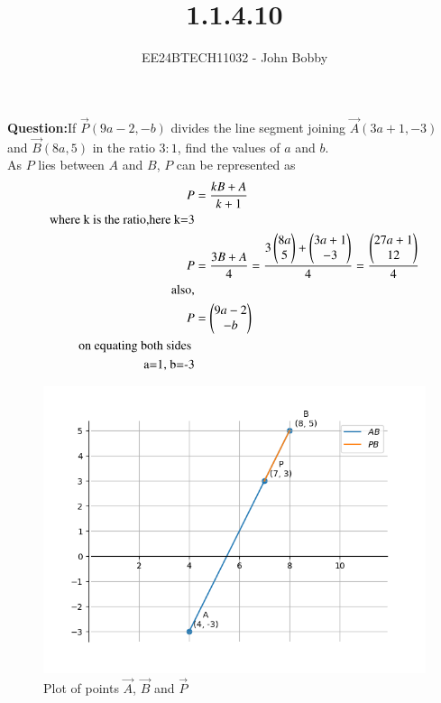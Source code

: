 \documentclass[journal]{IEEEtran}
\begin{document}

\vspace{3cm}
\title{1.1.4.10}
\author{EE24BTECH11032 - John Bobby}
{\let\newpage\relax\maketitle}

\renewcommand{\thefigure}{\theenumi}
\renewcommand{\thetable}{\theenumi}
\setlength{\intextsep}{10pt} %


\renewcommand{\thetable}{\theenumi}

\textbf{Question:}If $\vec{P}(9a-2,-b)$ divides the line segment joining $\vec{A}(3a+1,-3)$ and $\vec{B}(8a,5)$  
		in the ratio $3:1$, find the values of $a$ and $b$.\\
 
		\solution As $P$ lies between $A$ and $B$, $P$ can be represented as\\ 
		\begin{align}
			P &=\frac{kB+A}{k+1}\\ 
			\text{where k is the ratio,here k=3}\\
			P &=\frac{3B+A}{4}=\frac{3\begin{pmatrix}8a\\5\end{pmatrix}+\begin{pmatrix}3a+1\\-3\end{pmatrix}}{4}=\frac{\begin{pmatrix}27a+1\\12\end{pmatrix}}{4}\\
			\text{also,}\\
			P &=\begin{pmatrix}9a-2\\-b\end{pmatrix}\\
			\text{on equating both sides }\\
			\text{a=1, b=-3}
		\end{align}
\begin{figure}[h!]
                \centering
               \includegraphics[width=0.7\linewidth]{Figs/Fig1.png}
			\caption{Plot of points $\vec{A}$, $\vec{B}$ and $\vec{P}$}
               \label{stemplot}
               \end{figure}
\end{document}
